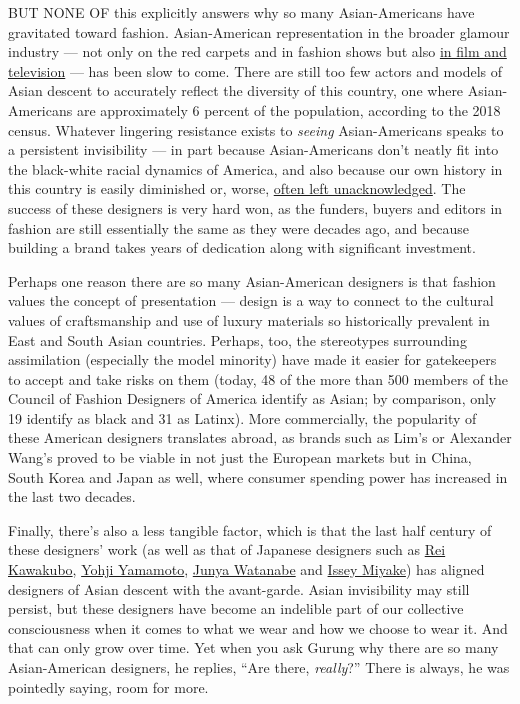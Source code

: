 BUT NONE OF this explicitly answers why so many Asian-Americans have
gravitated toward fashion. Asian-American representation in the broader
glamour industry --- not only on the red carpets and in fashion shows
but also
\href{https://www.nytimes.com/2018/11/06/t-magazine/asian-american-actors-representation.html}{in
film and television} --- has been slow to come. There are still too few
actors and models of Asian descent to accurately reflect the diversity
of this country, one where Asian-Americans are approximately 6 percent
of the population, according to the 2018 census. Whatever lingering
resistance exists to \emph{seeing} Asian-Americans speaks to a
persistent invisibility --- in part because Asian-Americans don't neatly
fit into the black-white racial dynamics of America, and also because
our own history in this country is easily diminished or, worse,
\href{https://www.nytimes.com/2019/11/04/t-magazine/japanese-american-novel.html}{often
left unacknowledged}. The success of these designers is very hard won,
as the funders, buyers and editors in fashion are still essentially the
same as they were decades ago, and because building a brand takes years
of dedication along with significant investment.

Perhaps one reason there are so many Asian-American designers is that
fashion values the concept of presentation --- design is a way to
connect to the cultural values of craftsmanship and use of luxury
materials so historically prevalent in East and South Asian countries.
Perhaps, too, the stereotypes surrounding assimilation (especially the
model minority) have made it easier for gatekeepers to accept and take
risks on them (today, 48 of the more than 500 members of the Council of
Fashion Designers of America identify as Asian; by comparison, only 19
identify as black and 31 as Latinx). More commercially, the popularity
of these American designers translates abroad, as brands such as Lim's
or Alexander Wang's proved to be viable in not just the European markets
but in China, South Korea and Japan as well, where consumer spending
power has increased in the last two decades.

Finally, there's also a less tangible factor, which is that the last
half century of these designers' work (as well as that of Japanese
designers such as
\href{https://www.nytimes.com/2018/09/03/t-magazine/rei-kawakubo-comme-des-garcons-menswear.html}{Rei
Kawakubo}, \href{https://theshopyohjiyamamoto.com/}{Yohji Yamamoto},
\href{https://www.nytimes.com/2016/10/17/t-magazine/junya-watanabe-interview.html}{Junya
Watanabe} and \href{https://www.isseymiyake.com/en/}{Issey Miyake}) has
aligned designers of Asian descent with the avant-garde. Asian
invisibility may still persist, but these designers have become an
indelible part of our collective consciousness when it comes to what we
wear and how we choose to wear it. And that can only grow over time. Yet
when you ask Gurung why there are so many Asian-American designers, he
replies, ``Are there, \emph{really}?'' There is always, he was pointedly
saying, room for more.

